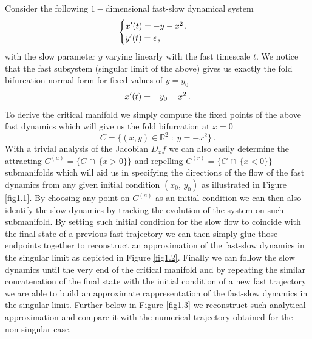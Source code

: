 \documentclass[../main.tex]{subfiles}
\begin{document}
\begin{example}[label=ex1.1]{}{}
     Consider the following $1-$dimensional fast-slow dynamical system
     \begin{equation*}
        \begin{cases}
            x'(t) = -y -x^{2}\,, \\
            y'(t) = \epsilon \,, 
        \end{cases}
     \end{equation*}
     with the slow parameter $y$ varying linearly with the fast timescale $t$. We notice that the fast subsystem (singular limit of the above) gives us exactly the fold bifurcation normal form for fixed values of $y=y_0$
     \begin{equation*}
          x'(t) = -y_0 - x^{2}\,.
     \end{equation*}
    To derive the critical manifold we simply compute the fixed points of the above fast dynamics which will give us the fold bifurcation at $x=0$
    \begin{equation*}\label{eq}
            C=\{(x,y)\in \mathbb{R}^{2}\;:\; y=-x^{2}\}\,.
    \end{equation*}
    With a trivial analysis of the Jacobian $D_{x}f$ we can also easily determine the attracting $C^{(a)}=\{C\,\cap\,\{x>0\}\}$ and repelling $C^{(r)}=\{C\,\cap\,\{x<0\}\}$ submanifolds which will aid us in specifying the directions of the flow of the fast dynamics from any given initial condition $(x_{0},\,y_0)$ as illustrated in Figure \ref{fig1.1}. 
    \newline
    By choosing any point on $C^{(a)}$ as an initial condition we can then also identify the slow dynamics by tracking the evolution of the system on such submanifold.
    By setting such initial condition for the slow flow to coincide with the final state of a previous fast trajectory we can then simply glue those endpoints together to reconstruct an approximation of the fast-slow dynamics in the singular limit as depicted in Figure \ref{fig1.2}.
    \newline
    Finally we can follow the slow dynamics until the very end of the critical manifold and by repeating the similar concatenation of the final state with the initial condition of a new fast trajectory we are able to build an approximate rappresentation of the fast-slow dynamics in the singular limit.
    \newline
    Further below in Figure \ref{fig1.3} we reconstruct such analytical approximation and compare it with the numerical trajectory obtained for the non-singular case.
\end{example}
\end{document}
